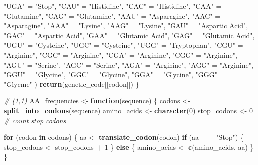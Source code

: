 \documentclass[
]{article}
\newenvironment{Shaded}{\begin{snugshade}}{\end{snugshade}}
\newcommand{\CommentTok}[1]{\textcolor[rgb]{0.56,0.35,0.01}{\textit{#1}}}
\newcommand{\ControlFlowTok}[1]{\textcolor[rgb]{0.13,0.29,0.53}{\textbf{#1}}}
\newcommand{\DecValTok}[1]{\textcolor[rgb]{0.00,0.00,0.81}{#1}}
\newcommand{\FunctionTok}[1]{\textcolor[rgb]{0.13,0.29,0.53}{\textbf{#1}}}
\newcommand{\NormalTok}[1]{#1}
\newcommand{\OtherTok}[1]{\textcolor[rgb]{0.56,0.35,0.01}{#1}}
\newcommand{\SpecialCharTok}[1]{\textcolor[rgb]{0.81,0.36,0.00}{\textbf{#1}}}
\newcommand{\StringTok}[1]{\textcolor[rgb]{0.31,0.60,0.02}{#1}}
\begin{document}
\begin{Shaded}
\begin{Highlighting}[]
    \StringTok{"UGA"} \OtherTok{=} \StringTok{"Stop"}\NormalTok{, }\StringTok{"CAU"} \OtherTok{=} \StringTok{"Histidine"}\NormalTok{, }\StringTok{"CAC"} \OtherTok{=} \StringTok{"Histidine"}\NormalTok{,}
    \StringTok{"CAA"} \OtherTok{=} \StringTok{"Glutamine"}\NormalTok{, }\StringTok{"CAG"} \OtherTok{=} \StringTok{"Glutamine"}\NormalTok{, }\StringTok{"AAU"} \OtherTok{=} \StringTok{"Asparagine"}\NormalTok{, }
    \StringTok{"AAC"} \OtherTok{=} \StringTok{"Asparagine"}\NormalTok{, }\StringTok{"AAA"} \OtherTok{=} \StringTok{"Lysine"}\NormalTok{, }\StringTok{"AAG"} \OtherTok{=} \StringTok{"Lysine"}\NormalTok{,}
    \StringTok{"GAU"} \OtherTok{=} \StringTok{"Aspartic Acid"}\NormalTok{, }\StringTok{"GAC"} \OtherTok{=} \StringTok{"Aspartic Acid"}\NormalTok{,  }\StringTok{"GAA"} \OtherTok{=} \StringTok{"Glutamic Acid"}\NormalTok{, }
    \StringTok{"GAG"} \OtherTok{=} \StringTok{"Glutamic Acid"}\NormalTok{, }\StringTok{"UGU"} \OtherTok{=} \StringTok{"Cysteine"}\NormalTok{, }\StringTok{"UGC"} \OtherTok{=} \StringTok{"Cysteine"}\NormalTok{,}
    \StringTok{"UGG"} \OtherTok{=} \StringTok{"Tryptophan"}\NormalTok{, }\StringTok{"CGU"} \OtherTok{=} \StringTok{"Arginine"}\NormalTok{, }\StringTok{"CGC"} \OtherTok{=} \StringTok{"Arginine"}\NormalTok{, }
    \StringTok{"CGA"} \OtherTok{=} \StringTok{"Arginine"}\NormalTok{, }\StringTok{"CGG"} \OtherTok{=} \StringTok{"Arginine"}\NormalTok{, }\StringTok{"AGU"} \OtherTok{=} \StringTok{"Serine"}\NormalTok{, }\StringTok{"AGC"} \OtherTok{=} \StringTok{"Serine"}\NormalTok{,}
    \StringTok{"AGA"} \OtherTok{=} \StringTok{"Arginine"}\NormalTok{, }\StringTok{"AGG"} \OtherTok{=} \StringTok{"Arginine"}\NormalTok{, }\StringTok{"GGU"} \OtherTok{=} \StringTok{"Glycine"}\NormalTok{, }\StringTok{"GGC"} \OtherTok{=} \StringTok{"Glycine"}\NormalTok{,}
    \StringTok{"GGA"} \OtherTok{=} \StringTok{"Glycine"}\NormalTok{, }\StringTok{"GGG"} \OtherTok{=} \StringTok{"Glycine"}
\NormalTok{  )}
  \FunctionTok{return}\NormalTok{(genetic\_code[[codon]])}
\NormalTok{\}}

\CommentTok{\# (1,1)}
\NormalTok{AA\_frequencies }\OtherTok{\textless{}{-}} \ControlFlowTok{function}\NormalTok{(sequence) \{}
\NormalTok{  codons }\OtherTok{\textless{}{-}} \FunctionTok{split\_into\_codons}\NormalTok{(sequence)}
\NormalTok{  amino\_acids }\OtherTok{\textless{}{-}} \FunctionTok{character}\NormalTok{(}\DecValTok{0}\NormalTok{)}
\NormalTok{  stop\_codons }\OtherTok{\textless{}{-}} \DecValTok{0}  \CommentTok{\# count stop codons}
  
  \ControlFlowTok{for}\NormalTok{ (codon }\ControlFlowTok{in}\NormalTok{ codons) \{}
\NormalTok{    aa }\OtherTok{\textless{}{-}} \FunctionTok{translate\_codon}\NormalTok{(codon)}
    \ControlFlowTok{if}\NormalTok{ (aa }\SpecialCharTok{==} \StringTok{"Stop"}\NormalTok{) \{}
\NormalTok{      stop\_codons }\OtherTok{\textless{}{-}}\NormalTok{ stop\_codons }\SpecialCharTok{+} \DecValTok{1}
\NormalTok{    \} }\ControlFlowTok{else}\NormalTok{ \{}
\NormalTok{      amino\_acids }\OtherTok{\textless{}{-}} \FunctionTok{c}\NormalTok{(amino\_acids, aa)}
\NormalTok{    \}}
\NormalTok{  \} }
  

\end{Highlighting}
\end{Shaded}
\end{document}
